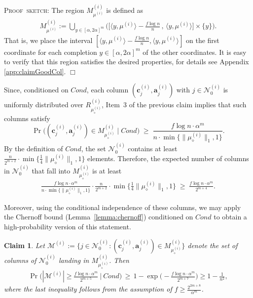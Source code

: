 \documentclass{article}
\newcommand{\R}{\mathbb{R}}
\newcommand{\ip}{\iprods}
\newcommand{\cN}{\mathcal{N}}
\newcommand{\av}[0]{\mathbf{a}}
\newcommand{\cv}[0]{\mathbf{c}}
\newcommand{\cM}{\mathcal{M}}
\newcommand{\normm}[1]{\big\lVert#1\big\rVert}
\newcommand{\iprods}[2]{\langle {#1}, {#2} \rangle}
\newcommand{\colij}{\av^{(i)}_j}
\newtheorem{claim}[thm]{Claim}
\newcommand{\nrc}{R}
\newenvironment{proof}[1][]
   {\textsc{Proof#1: }}
   {\hfill$\Box$\smallskip}
\begin{document}
\begin{proof}[~sketch]
The region $M^{(i)}_{\mu^{(i)}}$ is defined as 
%
    \begin{align*}
    M^{(i)}_{\mu^{(i)}} := \bigcup_{y \in [\alpha,2\alpha]^m} \bigg(\Big[\ip{y}{\mu^{(i)}} - \tfrac{f\log n}{n}\,,\, \ip{y}{\mu^{(i)}}\Big] \times \{y\}\bigg).
    \end{align*} 
That is, we place the interval $[\ip{y}{\mu^{(i)}} - \tfrac{f\log n}{n}, \ip{y}{\mu^{(i)}}]$ on the first coordinate for each completion $y \in [\alpha, 2\alpha]^m$ of the other coordinates. It is easy to verify that this region satisfies the desired properties, for details see Appendix \ref{app:claimGoodCol}.
\end{proof}

Since, conditioned on $Cond$, each column $(\cv^{(i)}_j, \colij)$ with
$j \in \cN^{(i)}_0$ is uniformly distributed over
$\nrc^{(i)}_{\mu^{(i)}_{\diamond}}$, Item~3 of the previous claim implies that
such columns satisfy
\[
\Pr\Big( (\cv^{(i)}_j, \colij) \in M^{(i)}_{\mu^{(i)}_{\diamond}}
\;\Big|\; Cond \Big)
\;\ge\;
\frac{f \log n \cdot \alpha^{m}}{n \cdot \min\{\normm{\mu^{(i)}_\diamond}_1, 1\}}.
\]
By the definition of $Cond$, the set $\cN^{(i)}_0$ contains at least
$\frac{n}{2^{m+2}} \cdot
\min\Big\{ \tfrac{1}{4}\normm{\mu^{(i)}_\diamond}_1, 1 \Big\}$
elements. Therefore, the expected number of columns in $\cN^{(i)}_0$ that fall
into $M^{(i)}_{\mu^{(i)}_{\diamond}}$ is at least
%
\begin{align*}
\frac{f \log n \cdot \alpha^{m}}{n \cdot \min\{\normm{\mu^{(i)}_\diamond}_1, 1\}}
\cdot
\frac{n}{2^{m+2}}
\cdot
\min\Big\{ \tfrac{1}{4}\normm{\mu^{(i)}_\diamond}_1, 1 \Big\}
\;\ge\;
\frac{f \log n \cdot \alpha^{m}}{2^{m+4}}.
\end{align*}

Moreover, using the conditional independence of these columns, we may apply the
Chernoff bound (Lemma~\ref{lemma:chernoff}) conditioned on $Cond$ to obtain a
high-probability version of this statement.

\begin{claim} \label{claim:chernoffM}
    Let $\cM^{(i)} := \Big\{j \in \cN^{(i)}_0 : (\cv^{(i)}_j, \colij) \in M^{(i)}_{\mu^{(i)}_{\diamond}}\Big\}$ denote the set of columns of $\cN^{(i)}_0$ landing in $M^{(i)}_{\mu^{(i)}_{\diamond}}$. Then
    \vspace{-8pt}
    \begin{align*}
        \Pr\bigg(|\cM^{(i)}| \ge \frac{f \log n \cdot \alpha^m}{2^{m+{5}}} ~\bigg|~ Cond \bigg) \,\ge\, 1 - \exp\bigg(- \frac{f \log n \cdot \alpha^m}{2^{m+{7}}} \bigg) \ge 1 - \frac{1}{n^2},
    \end{align*}   
    where the last inequality follows from the assumption of $f \geq \frac{2^{2m+8}}{\alpha^m}$.
\end{claim}
\end{document}
